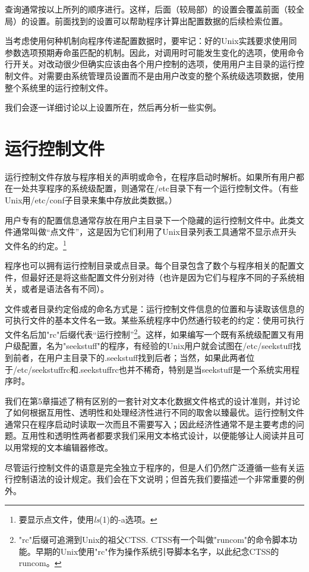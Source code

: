 \documentclass[12pt,oneside]{book}
\begin{document}
\begin{common-format}
查询通常按以上所列的顺序进行。这样，后面（较局部）的设置会覆盖前面（较全局）的设置。前面找到的设置可以帮助程序计算出配置数据的后续检索位置。

当考虑使用何种机制向程序传递配置数据时，要牢记：好的Unix实践要求使用同参数选项预期寿命虽匹配的机制。因此，对调用时可能发生变化的选项，使用命令行开关。对改动很少但确实应该由各个用户控制的选项，使用用户主目录的运行控制文件。对需要由系统管理员设置而不是由用户改变的整个系统级选项数据，使用整个系统里的运行控制文件。

我们会逐一详细讨论以上设置所在，然后再分析一些实例。

\section{运行控制文件}
运行控制文件存放与程序相关的声明或命令，在程序启动时解析。如果所有用户都在一处共享程序的系统级配置，则通常在/etc目录下有一个运行控制文件。（有些Unix用/etc/conf子目录来集中存放此类数据。）

用户专有的配置信息通常存放在用户主目录下一个隐藏的运行控制文件中。此类文件通常叫做“点文件”，这是因为它们利用了Unix目录列表工具通常不显示点开头文件名的约定。\footnote{要显示点文件，使用\textit{ls}(1)的-a选项。}

程序也可以拥有运行控制目录或点目录。每个目录包含了数个与程序相关的配置文件，但最好还是将这些配置文件分别对待（也许是因为它们与程序不同的子系统相关，或者是语法各有不同）。

文件或者目录约定俗成的命名方式是：运行控制文件信息的位置和与读取该信息的可执行文件的基本文件名一致。某些系统程序中仍然通行较老的约定：使用可执行文件名后加"rc"后缀代表“运行控制”\footnote{"rc"后缀可追溯到Unix的祖父CTSS. CTSS有一个叫做"runcom"的命令脚本功能。早期的Unix使用"rc"作为操作系统引导脚本名字，以此纪念CTSS的runcom。}。这样，如果编写一个既有系统级配置又有用户级配置，名为"seekstuff"的程序，有经验的Unix用户就会试图在/etc/seekstuff找到前者，在用户主目录下的.seekstuff找到后者；当然，如果此两者位于/etc/seekstuffrc和.seekstuffrc也并不稀奇，特别是当seekstuff是一个系统实用程序时。

我们在第5章描述了稍有区别的一套针对文本化数据文件格式的设计准则，并讨论了如何根据互用性、透明性和处理经济性进行不同的取舍以臻最优。运行控制文件通常只在程序启动时读取一次而且不需要写入；因此经济性通常不是主要考虑的问题。互用性和透明性两者都要求我们采用文本格式设计，以便能够让人阅读并且可以用常规的文本编辑器修改。

尽管运行控制文件的语意是完全独立于程序的，但是人们仍然广泛遵循一些有关运行控制语法的设计规定。我们会在下文说明；但首先我们要描述一个非常重要的例外。


\end{common-format}
\end{document}
